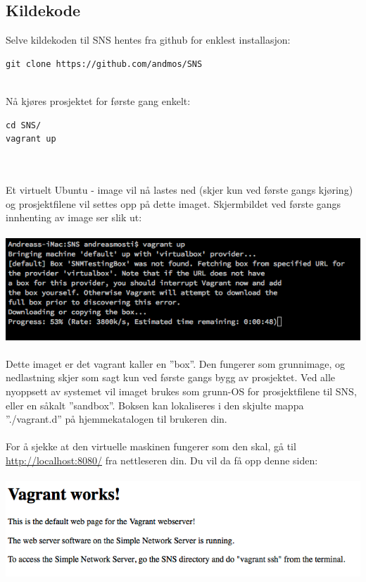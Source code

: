 \documentclass{article}
\begin{document}
\subsection{Kildekode}
Selve kildekoden til SNS hentes fra github for enklest installasjon: 

\begin{lstlisting}
git clone https://github.com/andmos/SNS
\end{lstlisting}
\\
Nå kjøres prosjektet for første gang enkelt: 
\begin{lstlisting}
cd SNS/
vagrant up
\end{lstlisting}
\\ \\
Et virtuelt Ubuntu - image vil nå lastes ned (skjer kun ved første gangs kjøring) og prosjektfilene vil settes opp på dette imaget. 
Skjermbildet ved første gangs innhenting av image ser slik ut: \\ \\
\includegraphics[scale = 0.7]{vagrantFirstTime.png}
\\ \\
Dette imaget er det vagrant kaller en ''box''. Den fungerer som grunnimage, og nedlastning skjer som sagt kun ved første gangs bygg av prosjektet. Ved alle nyoppsett av systemet vil imaget brukes som grunn-OS for prosjektfilene til SNS, eller en såkalt ''sandbox''. Boksen kan lokaliseres i den skjulte mappa ''./vagrant.d'' på hjemmekatalogen til brukeren din. \\ \\
For å sjekke at den virtuelle maskinen fungerer som den skal, gå til \url{http://localhost:8080/} fra nettleseren din. Du vil da få opp denne siden:
\\ \\
\includegraphics[scale = 0.7]{vagrantWorks.png} 
\\ \\
\end{document}
